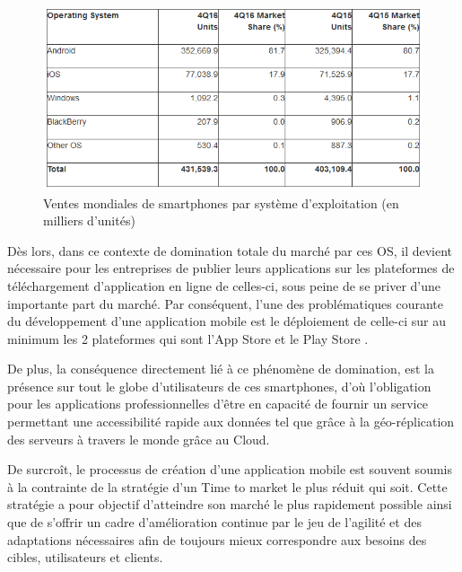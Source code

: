 \documentclass[11]{article}
\begin{document}
\vspace{0.5cm}


\begin{figure}[h]
    \centering
    \includegraphics[width=1\textwidth]{gartner1}
    \caption{Ventes mondiales de smartphones par système d'exploitation (en milliers d'unités)}
    \label{bat2}
\end{figure}




Dès lors, dans ce contexte de domination totale du marché par ces OS, il devient nécessaire pour les entreprises de publier leurs applications sur les plateformes de téléchargement d’application en ligne de celles-ci, sous peine de se priver d’une importante part du marché. Par conséquent, l’une des problématiques courante du développement d’une application mobile est le déploiement de celle-ci sur au minimum les 2 plateformes qui sont l’App Store et le Play Store .

\vspace{0.5cm}

De plus, la conséquence directement lié à ce phénomène de domination, est la présence sur tout le globe d’utilisateurs de ces smartphones, d'où l’obligation pour les applications professionnelles d’être en capacité de fournir un service permettant une accessibilité rapide aux données tel que grâce à la géo-réplication des serveurs à travers le monde grâce au Cloud.

\vspace{0.5cm}

De surcroît, le processus de création d’une application mobile est souvent soumis à la contrainte de la stratégie d’un Time to market le plus réduit qui soit. Cette stratégie a pour objectif d’atteindre son marché le plus rapidement possible ainsi que de s’offrir un cadre d’amélioration continue par le jeu de l’agilité et des adaptations nécessaires afin de toujours mieux correspondre aux besoins des cibles, utilisateurs et clients.
\end{document}
